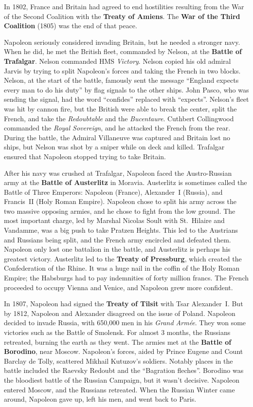 In 1802, France and Britain had agreed to end hostilities resulting from the War of the Second Coalition
with the \textbf{Treaty of Amiens}.
The \textbf{War of the Third Coalition} (1805) was the end of that peace.

Napoleon seriously considered invading Britain, but he needed a stronger navy.
When he did, he met the British fleet, commanded by Nelson, at the \textbf{Battle of Trafalgar}.
Nelson commanded HMS \textit{Victory}.
Nelson copied his old admiral Jarvis by trying to split Napoleon's forces and taking the French in two blocks.
Nelson, at the start of the battle, famously sent the message
``England expects every man to do his duty'' by flag signals to the other ships.
John Pasco, who was sending the signal, had the word ``confides'' replaced with ``expects''.
Nelson's fleet was hit by cannon fire, but the British were able to break the center, split the French,
and take the \textit{Redoubtable} and the \textit{Bucentaure}.
Cuthbert Collingwood commanded the \textit{Royal Sovereign}, and he attacked the French from the rear.
During the battle, the Admiral Villaneuve was captured and Britain lost no ships,
but Nelson was shot by a sniper while on deck and killed.
Trafalgar ensured that Napoleon stopped trying to take Britain.

After his navy was crushed at Trafalgar,
Napoleon faced the Austro-Russian army at the \textbf{Battle of Austerlitz} in Moravia.
Austerlitz is sometimes called the Battle of Three Emperors:
Napoleon (France), Alexander~I (Russia), and Francis~II (Holy Roman Empire).
Napoleon chose to split his army across the two massive opposing armies, and he chose to fight from the low ground.
The most important charge, led by Marshal Nicolas Soult with St.\ Hilaire and Vandamme,
was a big push to take Pratzen Heights.
This led to the Austrians and Russians being split, and the French army encircled and defeated them.
Napoleon only lost one battalion in the battle, and Austerlitz is perhaps his greatest victory.
Austerlitz led to the \textbf{Treaty of Pressburg}, which created the Confederation of the Rhine.
It was a huge nail in the coffin of the Holy Roman Empire;
the Habsburgs had to pay indemnities of forty million francs.
The French proceeded to occupy Vienna and Venice, and Napoleon grew more confident.

In 1807, Napoleon had signed the \textbf{Treaty of Tilsit} with Tsar Alexander~I.
But by 1812, Napoleon and Alexander disagreed on the issue of Poland.
Napoleon decided to invade Russia, with 650,000 men in his \textit{Grand Arm\'ee}.
They won some victories such as the Battle of Smolensk.
For almost 3 months, the Russians retreated, burning the earth as they went.
The armies met at the \textbf{Battle of Borodino}, near Moscow.
Napoleon's forces, aided by Prince Eugene and Count Barclay de Tolly, scattered Mikhail Kutuzov's soldiers.
Notably places in the battle included the Raevsky Redoubt and the ``Bagration fleches''.
Borodino was the bloodiest battle of the Russian Campaign, but it wasn't decisive.
Napoleon entered Moscow, and the Russians retreated.
When the Russian Winter came around, Napoleon gave up, left his men, and went back to Paris.

